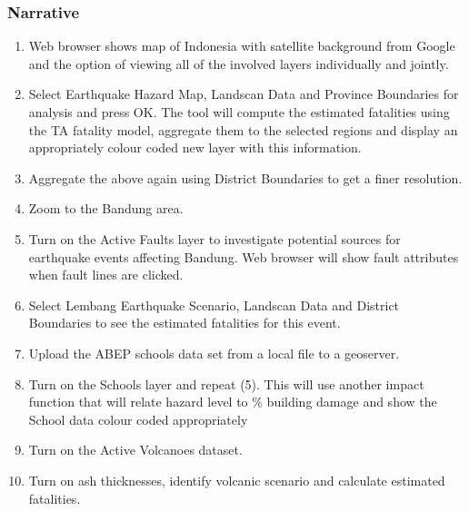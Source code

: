 \documentclass[a4paper]{article}
\begin{document}
\subsubsection*{Narrative}

\begin{enumerate} 
  \item Web browser shows map of Indonesia with satellite background from Google and the option of viewing all of the involved layers individually and jointly.
  \item Select Earthquake Hazard Map, Landscan Data and Province Boundaries for analysis and press OK. The tool will compute the estimated fatalities using the TA fatality model, aggregate them to the selected regions and display an appropriately colour coded new layer with this information.
  \item Aggregate the above again using District Boundaries to get a finer resolution.
  \item Zoom to the Bandung area.
  \item Turn on the Active Faults layer to investigate potential sources for earthquake events affecting Bandung. Web browser will show fault attributes when fault lines are clicked.
  \item Select Lembang Earthquake Scenario, Landscan Data and District Boundaries to see the estimated fatalities for this event.
  \item Upload the ABEP schools data set from a local file to a geoserver.
  \item Turn on the Schools layer and repeat (5). This will use another impact function that will relate hazard level to \% building damage and show the School data colour coded appropriately
  \item Turn on the Active Volcanoes dataset.
  \item Turn on ash thicknesses, identify volcanic scenario and calculate estimated fatalities.
\end{enumerate} 
\end{document}
